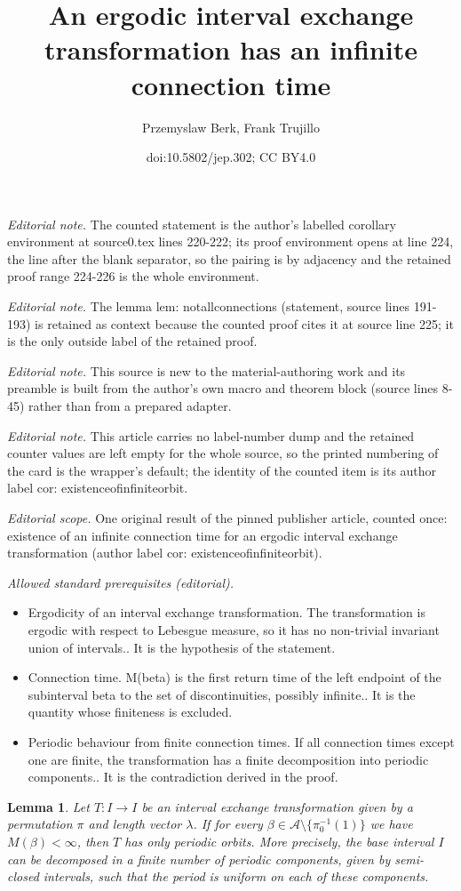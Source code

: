 \documentclass[10pt,a4paper]{article}
\title{An ergodic interval exchange transformation has an infinite connection time}
\author{Przemyslaw Berk, Frank Trujillo}
\date{doi:10.5802/jep.302; CC BY4.0}
\theoremstyle{plain}
\newtheorem{lemma}[theorem]{Lemma}
\theoremstyle{definition}
\newcommand{\A}{\mathcal{A}}
\begin{document}
\maketitle
\noindent\textit{Editorial note.} The counted statement is the author's labelled corollary environment at source0.tex lines 220-222; its proof environment opens at line 224, the line after the blank separator, so the pairing is by adjacency and the retained proof range 224-226 is the whole environment.\par\medskip
\noindent\textit{Editorial note.} The lemma lem: notallconnections (statement, source lines 191-193) is retained as context because the counted proof cites it at source line 225; it is the only outside label of the retained proof.\par\medskip
\noindent\textit{Editorial note.} This source is new to the material-authoring work and its preamble is built from the author's own macro and theorem block (source lines 8-45) rather than from a prepared adapter.\par\medskip
\noindent\textit{Editorial note.} This article carries no label-number dump and the retained counter values are left empty for the whole source, so the printed numbering of the card is the wrapper's default; the identity of the counted item is its author label cor: existenceofinfiniteorbit.\par\medskip
\noindent\textit{Editorial scope.} One original result of the pinned publisher article, counted once: existence of an infinite connection time for an ergodic interval exchange transformation (author label cor: existenceofinfiniteorbit).\par\medskip
\noindent\textit{Allowed standard prerequisites (editorial).}\begin{itemize}
\item Ergodicity of an interval exchange transformation. The transformation is ergodic with respect to Lebesgue measure, so it has no non-trivial invariant union of intervals.. It is the hypothesis of the statement.
\item Connection time. M(beta) is the first return time of the left endpoint of the subinterval beta to the set of discontinuities, possibly infinite.. It is the quantity whose finiteness is excluded.
\item Periodic behaviour from finite connection times. If all connection times except one are finite, the transformation has a finite decomposition into periodic components.. It is the contradiction derived in the proof.
\end{itemize}\medskip
\begin{lemma}\label{lem: notallconnections}
Let $T:I\to I$ be an interval exchange transformation given by a permutation $\pi$ and length vector $\lambda$. If for every $\beta\in \A\setminus \{\pi_0^{-1}(1)\}$ we have $M(\beta)<\infty$, then $T$ has only periodic orbits. {More precisely, the base interval $I$ can be decomposed in a finite number of periodic components, given by semi-closed intervals, such that the period is uniform on each of these components.}
\end{lemma}
\end{document}
